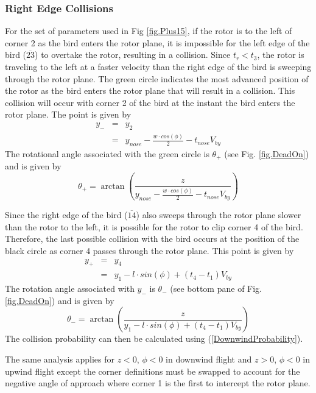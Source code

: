 \label{} \documentclass[10pt,conference]{IEEEtran}
\begin{document}
\subsubsection{Right Edge Collisions}
For the set of parameters used in Fig \ref{fig.Plus15}, if the rotor is to the left of corner 2 as the bird enters the
rotor plane, it is impossible for the left edge of the bird ($\overline{23}$) to overtake the rotor, resulting in a
collision. Since $t_r<t_3$, the rotor is traveling to the left at a faster velocity than the right edge of the bird is
sweeping through the rotor plane. The green circle indicates the most advanced position of the rotor as the bird enters
the rotor plane that will result in a collision. This collision will occur with corner 2 of the bird at the instant the
bird enters the rotor plane. The point is given by
\begin{eqnarray}
    \nonumber y_- &=& y_2\\
    &=& y_{nose}-\frac{w \cdot cos(\phi)}{2}-t_{nose}V_{by}
\end{eqnarray}
The rotational angle associated with the green circle is $\theta_+$ (see Fig. \ref{fig.DeadOn}) and is given by
\begin{equation}
    \theta_+ = \arctan\left(\frac{z}{y_{nose}-\frac{w \cdot cos(\phi)}{2}-t_{nose}V_{by}}\right)
\end{equation}

Since the right edge of the bird ($\overline{14}$) also sweeps through the rotor plane slower than the rotor to the
left, it is possible for the rotor to clip corner 4 of the bird. Therefore, the last possible collision with the bird
occurs at the position of the black circle as corner 4 passes through the rotor plane. This point is given by
\begin{eqnarray}
    \nonumber y_+ &=& y_4\\
    &=& y_1-l \cdot sin(\phi) + (t_4-t_1)V_{by}
\end{eqnarray}
The rotation angle associated with $y_-$ is $\theta_-$ (see bottom pane of Fig. \ref{fig.DeadOn}) and is given by
\begin{equation}
    \theta_- = \arctan\left(\frac{z}{y_1-l \cdot sin(\phi) + (t_4-t_1)V_{by}}\right)
\end{equation}
The collision probability can then be calculated using (\ref{DownwindProbability}).

The same analysis applies for $z<0$, $\phi<0$ in downwind flight and $z>0$, $\phi<0$ in upwind flight except the corner
definitions must be swapped to account for the negative angle of approach where corner 1 is the first to intercept the
rotor plane.
\end{document}
